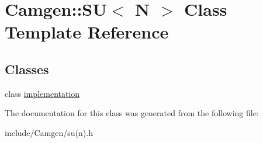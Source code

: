 \hypertarget{a00524}{}\section{Camgen\+:\+:S\+U$<$ N $>$ Class Template Reference}
\label{a00524}
\subsection*{Classes}
\begin{DoxyCompactItemize}
\item 
class \hyperlink{a00291}{implementation}
\end{DoxyCompactItemize}


The documentation for this class was generated from the following file\+:\begin{DoxyCompactItemize}
\item 
include/\+Camgen/su(n).\+h\end{DoxyCompactItemize}
